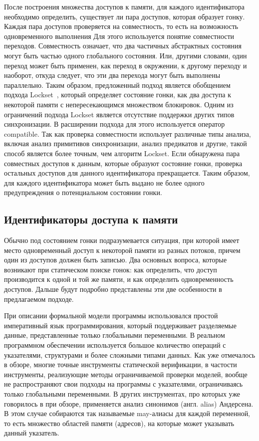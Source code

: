 После построения множества доступов к памяти, для каждого идентификатора необходимо определить, существует ли пара доступов, которая образует гонку.
Каждая пара доступов проверяется на совместность, то есть на возможность одновременного выполнения
Для этого используется понятие совместности переходов. Совместность означает, что два частичных абстрактных состояния могут быть частью одного глобального состояния.
Или, другими словами, один переход может быть применен, как переход в окружении, к другому переходу и наоборот, откуда следует, что эти два перехода могут быть выполнены параллельно.
Таким образом, предложенный подход является обобщением подхода Lockset~\cite{eraser}, который определяет состояние гонки, как два доступа к некоторой памяти с непересекающимся множеством блокировок.
Одним из ограничений подхода Lockset является отсутствие поддержки других типов синхронизации.
В расширении подхода для этого используется оператор compatible. 
Так как проверка совместности использует различные типы анализа, включая анализ примитивов синхронизации, анализ предикатов и другие, такой способ является более точным, чем алгоритм Lockset.
Если обнаружена пара совместных доступов к данным, которые образуют состояние гонки, проверка остальных доступов для данного идентификатора прекращается.
Таким образом, для каждого идентификатора может быть выдано не более одного предупреждения о потенциальном состоянии гонки.

\subsection{Идентификаторы доступа к памяти}
\label{subsect_impl_identifiers}

Обычно под состоянием гонки подразумевается ситуация, при которой имеет место одновременный доступ к некоторой памяти из разных потоков, причем один из доступов должен быть записью.
Два основных вопроса, которые возникают при статическом поиске гонок: как определить, что доступ производится к одной и той же памяти, и как определить одновременность доступов.
Дальше будут подробно представлены эти две особенности в предлагаемом подходе.

При описании формальной модели программы использовался простой императивный язык программирования, который поддерживает разделяемые данные, представленные только глобальными переменными.
В реальном программном обеспечении используется большое количество операций с указателями, структурами и более сложными типами данных.
Как уже отмечалось в обзоре, многие точные инструменты статической верификации, в частости инструменты, реализующие методы ограничиваемой проверки моделей, вообще не распространяют свои подходы на программы с указателями, ограничиваясь только глобальными переменными.
В других инструментах, про которых уже говорилось в при обзоре, применяется анализ синонимов (англ. alias) Андерсена.
В этом случае собираются так называемые may-алиасы для каждой переменной, то есть множество областей памяти (адресов), на которые может указывать данный указатель.

